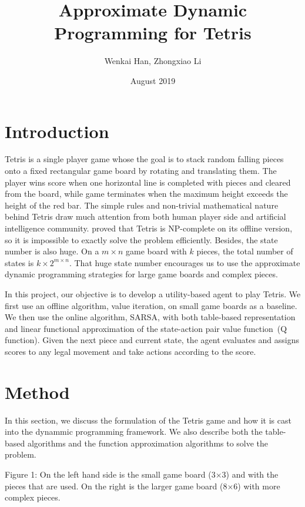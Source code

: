 \documentclass{article}
\title{Approximate Dynamic Programming for Tetris}
\author{Wenkai Han, Zhongxiao Li }
\date{August 2019}
\begin{document}
\maketitle

\section{Introduction}
Tetris is a single player game whose the goal is to stack random falling pieces onto a fixed rectangular game board by rotating and translating them. The player wins score when one horizontal line is completed with pieces and cleared from the board, while game terminates when the maximum height exceeds the height of the red bar. The simple rules and non-trivial mathematical nature behind Tetris draw much attention from both human player side and artificial intelligence community. \citep{} proved that Tetris is NP-complete on its offline version, so it is impossible to exactly solve the problem efficiently. Besides, the state number is also huge. On a $m\times n$ game board with $k$ pieces, the total number of states is $k \times 2^{m\times n}$. That huge state number encourages us to use the approximate dynamic programming strategies for large game boards and complex pieces.

In this project, our objective is to develop a utility-based agent to play Tetris. We first use an offline algorithm, value iteration\citep{}, on small game boards as a baseline. We then use the online algorithm, SARSA\citep{}, with both table-based representation and linear functional approximation of the state-action pair value function~(Q function). Given the next piece and current state, the agent evaluates and assigns scores to any legal movement and take actions according to the score.


\section{Method}
In this section, we discuss the formulation of the Tetris game and how it is cast into the dynammic programming framework. We also describe both the table-based algorithms and the function approximation algorithms to solve the problem.

Figure 1: On the left hand side is the small game board (3$\times$3) and with the pieces that are used. On the right is the larger game board (8$\times$6) with more complex pieces. 
\end{document}
